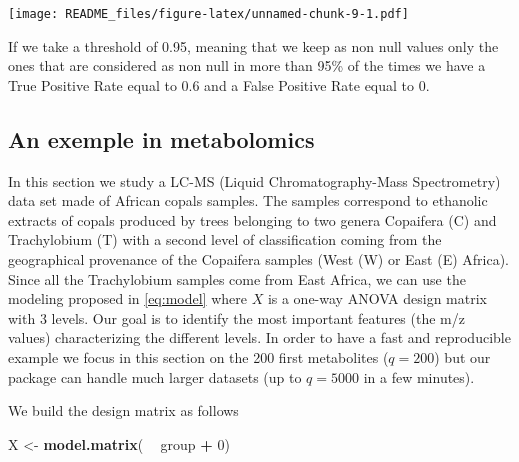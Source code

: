 \documentclass[]{article}
\newenvironment{Shaded}{\begin{snugshade}}{\end{snugshade}}
\newcommand{\KeywordTok}[1]{\textcolor[rgb]{0.13,0.29,0.53}{\textbf{#1}}}
\newcommand{\DecValTok}[1]{\textcolor[rgb]{0.00,0.00,0.81}{#1}}
\newcommand{\StringTok}[1]{\textcolor[rgb]{0.31,0.60,0.02}{#1}}
\newcommand{\OperatorTok}[1]{\textcolor[rgb]{0.81,0.36,0.00}{\textbf{#1}}}
\newcommand{\NormalTok}[1]{#1}
\begin{document}
\texttt{[image: README\_files/figure-latex/unnamed-chunk-9-1.pdf]}

If we take a threshold of 0.95, meaning that we keep as non null values
only the ones that are considered as non null in more than 95\% of the
times we have a True Positive Rate equal to 0.6 and a False Positive
Rate equal to 0.

\subsection{An exemple in
metabolomics}\label{an-exemple-in-metabolomics}

In this section we study a LC-MS (Liquid Chromatography-Mass
Spectrometry) data set made of African copals samples. The samples
correspond to ethanolic extracts of copals produced by trees belonging
to two genera Copaifera (C) and Trachylobium (T) with a second level of
classification coming from the geographical provenance of the Copaifera
samples (West (W) or East (E) Africa). Since all the Trachylobium
samples come from East Africa, we can use the modeling proposed in
\eqref{eq:model} where \(X\) is a one-way ANOVA design matrix with 3
levels. Our goal is to identify the most important features (the m/z
values) characterizing the different levels. In order to have a fast and
reproducible example we focus in this section on the 200 first
metabolites (\(q=200\)) but our package can handle much larger datasets
(up to \(q=5000\) in a few minutes).

\begin{Shaded}
\end{Shaded}

We build the design matrix as follows

\begin{Shaded}
\begin{Highlighting}[]
\NormalTok{X <-}\StringTok{ }\KeywordTok{model.matrix}\NormalTok{( }\OperatorTok{~}\StringTok{ }\NormalTok{group }\OperatorTok{+}\StringTok{ }\DecValTok{0}\NormalTok{)}
\end{Highlighting}
\end{Shaded}
\end{document}
